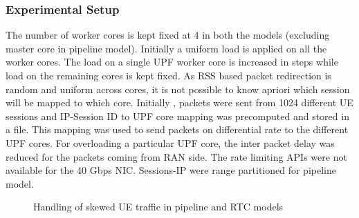 \subsubsection{Experimental Setup}
The number of worker cores is kept fixed at 4 in both the models (excluding master core in pipeline model).
Initially a uniform  load is applied on all the worker cores. The load on a single UPF worker core is increased in steps while load on the remaining cores is kept fixed.
As RSS based packet redirection is random and uniform across cores, it is not possible to know apriori which session will be mapped to which core. Initially , packets were sent from 1024 different UE sessions and IP-Session ID to UPF core mapping was precomputed and stored
 in a file. This mapping was used to send packets on differential rate to the different UPF
  cores. For overloading a particular UPF core, the inter packet delay was reduced for the packets coming from RAN side. The rate limiting APIs were not available for the 40 Gbps NIC.
Sessions-IP were range partitioned for pipeline model. 
\begin{figure}[htbp]
    \centering
    \caption{ Handling of skewed UE traffic in pipeline and RTC models }
    \label{figureSkewed}
\end{figure}


